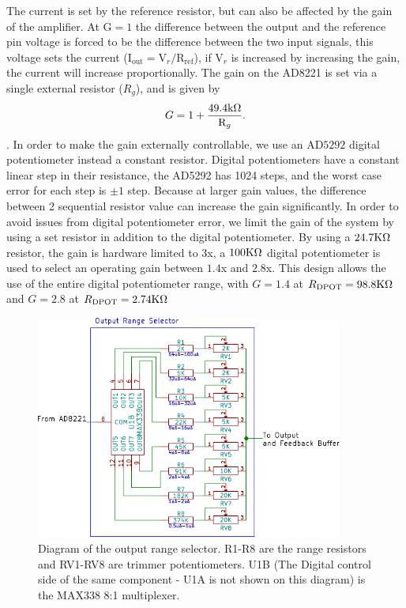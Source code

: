 The current is set by the reference resistor, but can also be affected by the gain of the amplifier. At $\text{G} = 1$ the difference between the output and the reference pin voltage is forced to be the difference between the two input signals, this voltage sets the current ($\text{I}_\text{out} = \text{V}_r/\text{R}_\text{ref}$), if $\text{V}_r$ is increased by increasing the gain, the current will increase proportionally. The gain on the AD8221 is set via a single external resistor ($R_g$), and is given by 
\begin{equation}
G = 1 + \frac{49.4\text{k}\Omega}{\text{R}_g}.
\end{equation}
. In order to make the gain externally controllable, we use an AD$5292$ digital potentiometer instead a constant resistor. Digital potentiometers have a constant linear step in their resistance, the AD5292 has 1024 steps, and the worst case error for each step is $\pm1$ step. Because  at larger gain values, the difference between 2 sequential resistor value can increase the gain significantly. In order to avoid issues from digital potentiometer error, we limit the gain of the system by using a set resistor in addition to the digital potentiometer. By using a $24.7\text{K}\Omega$ resistor, the gain is hardware limited to 3x, a $100\text{K}\Omega$ digital potentiometer is used to select an operating gain between $1.4$x and $2.8$x. This design allows the use of the entire digital potentiometer range, with $G=1.4$ at $R_\text{DPOT} = 98.8\text{K}\Omega$ and $G=2.8$ at $R_\text{DPOT} = 2.74\text{K}\Omega$


\begin{figure}[h]
\centering
\includegraphics[width=0.9\textwidth]{../assets/images/Range_Select/range_select}
\caption{Diagram of the output range selector. R1-R8 are the range resistors and RV1-RV8 are trimmer potentiometers. U1B (The Digital control side of the same component - U1A is not shown on this diagram) is the MAX338 8:1 multiplexer. }
\label{fig:range_select}
\end{figure}

